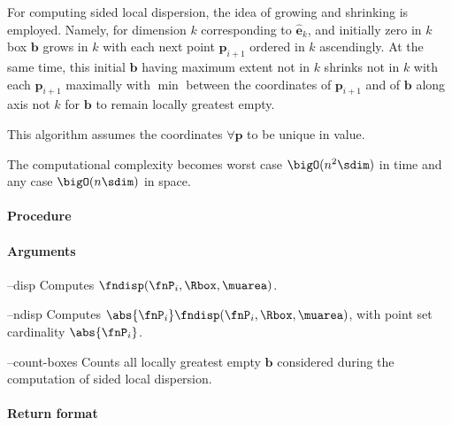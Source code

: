 For computing sided local dispersion, the idea of growing and shrinking is employed. Namely, for dimension $k$ corresponding to $\widehat{\bm e}_k$, and initially zero in $k$ box $\bm b$ grows in $k$ with each next point $\bm p_{i+1}$ ordered in $k$ ascendingly. At the same time, this initial $\bm b$ having maximum extent not in $k$ shrinks not in $k$ with each $\bm p_{i+1}$ maximally with $\min$ between the coordinates of $\bm p_{i+1}$ and of $\bm b$ along axis not $k$ for $\bm b$ to remain  locally greatest empty.

This algorithm assumes the coordinates $\forall \bm p$ to be unique in value.

The computational complexity becomes worst case $\bigO(n^2 \sdim)$ in time and any case $\bigO(n \sdim)$ in space.


\paragraph{Procedure}

\begin{synopsis}
\end{synopsis}

\paragraph{Arguments}

\begin{procarg}{--disp}
  Computes $\fndisp(\fnP_i, \Rbox, \muarea)$.
\end{procarg}

\begin{procarg}{--ndisp}
  Computes $\abs{\fnP_i} \fndisp(\fnP_i, \Rbox, \muarea)$, with point set cardinality $\abs{\fnP_i}$.
\end{procarg}

\begin{procarg}{--count-boxes}
  Counts all locally greatest empty $\bm b$ considered during the computation of sided local dispersion.
\end{procarg}

\procarginseq{\ptseqsize}

\procargout

\procargsilent

\paragraph{Return format}

